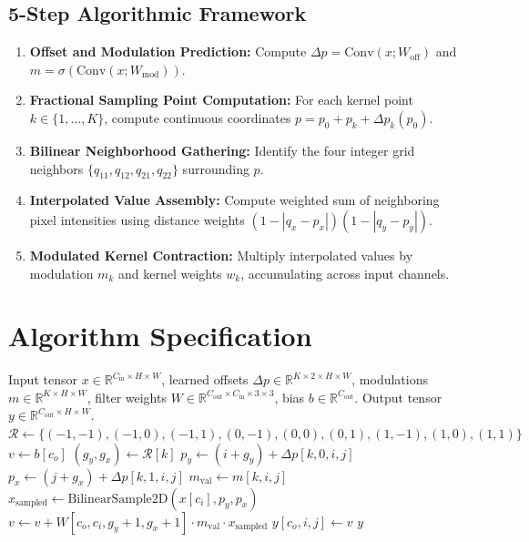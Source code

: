 \documentclass[11pt,a4paper]{article}
\theoremstyle{definition}
\begin{document}
\subsection{5-Step Algorithmic Framework}
\begin{enumerate}
    \item \textbf{Offset and Modulation Prediction:} Compute $\Delta p = \text{Conv}(x; W_{\text{off}})$ and $m = \sigma(\text{Conv}(x; W_{\text{mod}}))$.
    \item \textbf{Fractional Sampling Point Computation:} For each kernel point $k \in \{1,\dots, K\}$, compute continuous coordinates $p = p_0 + p_k + \Delta p_k(p_0)$.
    \item \textbf{Bilinear Neighborhood Gathering:} Identify the four integer grid neighbors $\{q_{11}, q_{12}, q_{21}, q_{22}\}$ surrounding $p$.
    \item \textbf{Interpolated Value Assembly:} Compute weighted sum of neighboring pixel intensities using distance weights $(1 - |q_x - p_x|)(1 - |q_y - p_y|)$.
    \item \textbf{Modulated Kernel Contraction:} Multiply interpolated values by modulation $m_k$ and kernel weights $w_k$, accumulating across input channels.
\end{enumerate}

\section{Algorithm Specification}

\begin{algorithm}[H]
\caption{Modulated Deformable Convolution Forward Pass}
\label{alg:deform_conv}
\begin{algorithmic}[1]
\Require Input tensor $x \in \mathbb{R}^{C_{\text{in}} \times H \times W}$, learned offsets $\Delta p \in \mathbb{R}^{K \times 2 \times H \times W}$, modulations $m \in \mathbb{R}^{K \times H \times W}$, filter weights $W \in \mathbb{R}^{C_{\text{out}} \times C_{\text{in}} \times 3 \times 3}$, bias $b \in \mathbb{R}^{C_{\text{out}}}$.
\Ensure Output tensor $y \in \mathbb{R}^{C_{\text{out}} \times H \times W}$.
\State $\mathcal{R} \gets \{(-1,-1), (-1,0), (-1,1), (0,-1), (0,0), (0,1), (1,-1), (1,0), (1,1)\}$
            \State $v \gets b[c_o]$
                \State $(g_y, g_x) \gets \mathcal{R}[k]$
                \State $p_y \gets (i + g_y) + \Delta p[k, 0, i, j]$
                \State $p_x \gets (j + g_x) + \Delta p[k, 1, i, j]$
                \State $m_{\text{val}} \gets m[k, i, j]$
                    \State $x_{\text{sampled}} \gets \text{BilinearSample2D}(x[c_i], p_y, p_x)$
                    \State $v \gets v + W[c_o, c_i, g_y+1, g_x+1] \cdot m_{\text{val}} \cdot x_{\text{sampled}}$
                \EndFor
            \EndFor
            \State $y[c_o, i, j] \gets v$
        \EndFor
    \EndFor
\EndFor
\State \Return $y$
\end{algorithmic}
\end{algorithm}
\end{document}
